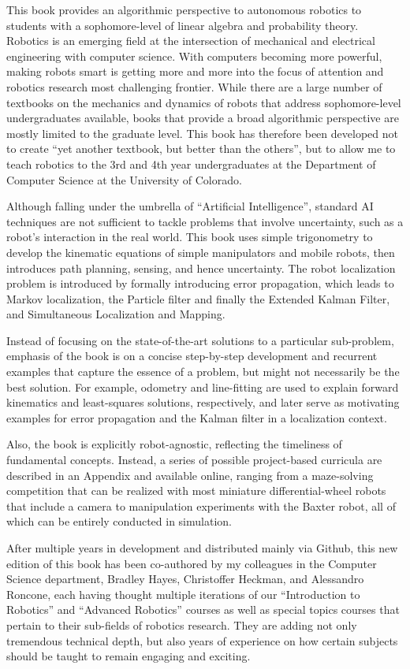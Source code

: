 \documentclass[paper=6.14in:9.21in,pagesize=pdftex,11pt,twoside,openright]{scrbook}
\begin{document}
This book provides an algorithmic perspective to autonomous robotics to students with a sophomore-level of linear algebra and probability theory. Robotics is an emerging field at the intersection of mechanical and electrical engineering with computer science. With computers becoming more powerful, making robots smart is getting more and more into the focus of attention and robotics research most challenging frontier. While there are a large number of textbooks on the mechanics and dynamics of robots that address sophomore-level undergraduates available, books that provide a broad algorithmic perspective are mostly limited to the graduate level. This book has therefore been developed not to create ``yet another textbook, but better than the others'', but to allow me to teach robotics to the 3rd and 4th year undergraduates at the Department of Computer Science at the University of Colorado.

Although falling under the umbrella of ``Artificial Intelligence'', standard AI techniques are not sufficient to tackle problems that involve uncertainty, such as a robot's interaction in the real world. This book uses simple trigonometry to develop the kinematic equations of simple manipulators and mobile robots, then introduces path planning, sensing, and hence uncertainty. The robot localization problem is introduced by formally introducing error propagation, which leads to Markov localization, the Particle filter and finally the Extended Kalman Filter, and Simultaneous Localization and Mapping.

Instead of focusing on the state-of-the-art solutions to a particular sub-problem, emphasis of the book is on a concise step-by-step development and recurrent examples that capture the essence of a problem, but might not necessarily be the best solution. For example, odometry and line-fitting are used to explain forward kinematics and least-squares solutions, respectively, and later serve as motivating examples for error propagation and the Kalman filter in a localization context.

Also, the book is explicitly robot-agnostic, reflecting the timeliness of fundamental concepts. Instead, a series of possible project-based curricula are described in an Appendix and available online, ranging from a maze-solving competition that can be realized with most miniature differential-wheel robots that include a camera to manipulation experiments with the Baxter robot, all of which can be entirely conducted in simulation.

After multiple years in development and distributed mainly via Github, this new edition of this book has been co-authored by my colleagues in the Computer Science department, Bradley Hayes, Christoffer Heckman, and Alessandro Roncone, each having thought multiple iterations of our ``Introduction to Robotics'' and ``Advanced Robotics'' courses as well as special topics courses that pertain to their sub-fields of robotics research. They are adding not only tremendous technical depth, but also years of experience on how certain subjects should be taught to remain engaging and exciting.
\end{document}
